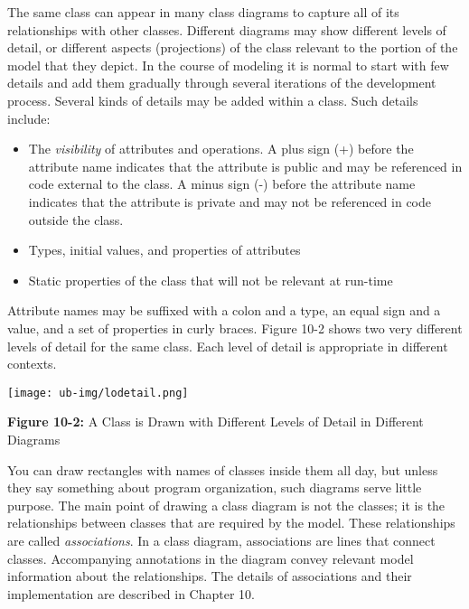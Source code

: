 The same class can appear in many class diagrams to capture all of its
relationships with other classes. Different diagrams may show different
levels of detail, or different aspects (projections) of the class
relevant to the portion of the model that they depict. In the course of
modeling it is normal to start with few details and add them gradually
through several iterations of the development process. Several kinds of
details may be added within a class. Such details include:

\begin{itemize}
\item The \textit{visibility} of
attributes and operations. A plus sign (+) before the attribute name
indicates that the attribute is public and may be
referenced in code external to the class. A minus sign
(-) before the attribute name indicates that the attribute is
private and may not be referenced in code outside the
class.
\item Types, initial values, and properties of attributes
\item Static properties of the class that will not be relevant at
run-time
\end{itemize}
Attribute names may be suffixed with a colon and a type, an equal sign
and a value, and a set of properties in curly braces. Figure 10-2 shows
two very different levels of detail for the same class. Each level of
detail is appropriate in different contexts.

\bigskip

\texttt{[image: ub-img/lodetail.png]}

{\sffamily\bfseries Figure 10-2:}
{\sffamily A Class is Drawn with Different Levels of Detail in
 Different Diagrams}

\bigskip

You can draw rectangles with names of classes inside them all day, but
unless they say something about program organization, such diagrams
serve little purpose. The main point of drawing a class diagram is not
the classes; it is the relationships between classes that are required
by the model. These relationships are called
\textit{associations}. In a class diagram,
associations are lines that connect classes. Accompanying annotations
in the diagram convey relevant model information about the
relationships. The details of associations and their implementation are
described in Chapter 10.

